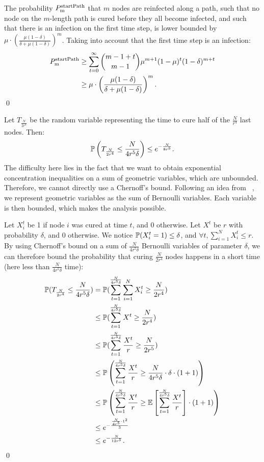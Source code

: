 \begin{corollary} \label{cor:Ppath} 
	The probability $P^{\rm startPath}_{\rm m}$ that $m$ nodes are reinfected along a path, such that no node on the $m$-length path is cured before they all become infected, and such that there is an infection on the first time step, is lower bounded by $\mu\cdot \left(\frac{\mu (1-\delta)}{\delta + \mu (1-\delta)} \right)^{m}$.
	\proof Taking into account that the first time step is an infection:
	\begin{align*}
	P^{\rm startPath}_{\rm m} &\geq \sum_{t=0}^{\infty}  {m - 1 + t \choose m - 1}  \mu^{m+1} (1-\mu)^t (1-\delta)^{m + t} \\
	&\geq \mu \cdot\left(\frac{\mu (1-\delta)}{\delta + \mu (1-\delta)} \right)^{m}.
	\end{align*}
	\qed 
\end{corollary}

\begin{proposition}\label{cl:chernoffEndgame} 
	Let $T_{\frac{N}{2r^4}}$ be the random variable representing the time to cure half of the $\frac{N}{r^4}$ last nodes. Then: 
	$$\mathbb{P}\left(T_{\frac{N}{2r^4}} \leq \frac{N}{4r^5\delta}\right) \leq e^{-\frac{N}{8r^5}}.$$
	\proof The difficulty here lies in the fact that we want to obtain exponential concentration inequalities on a sum of geometric variables, which are unbounded. Therefore, we cannot directly use a Chernoff's bound. Following an idea from ~\cite{Brown}, we represent geometric variables as the sum of Bernoulli variables. Each variable is then bounded, which makes the analysis possible.
	
	Let $X_i^t$ be 1 if node $i$ was cured at time $t$, and 0 otherwise. Let $X^t$ be $r$ with probability $\delta$, and 0 otherwise. We notice $\mathbb{P}(X_i^t = 1) \leq \delta$, and $\forall t, \sum_{i=1}^{N} X_i^t \leq r$. By using Chernoff's bound on a sum of $\frac{N}{4r^5\delta}$ Bernoulli variables of parameter $\delta$, we can therefore bound the probability that curing $\frac{N}{2r^4}$ nodes happens in a short time (here less than $\frac{N}{4r^5\delta}$ time):
	\begin{align*}
	\mathbb{P}(T_{\frac{N}{2r^4}} \leq \frac{N}{4r^5\delta}) &= \mathbb{P}(\sum_{t=1}^{\frac{N}{4r^5\delta}} \sum_{i=1}^{N} X_i^t \geq \frac{N}{2r^4}) \\
	&\leq \mathbb{P}(\sum_{t=1}^{ \frac{N}{4r^5\delta}} X^t \geq \frac{N}{2r^4}) \\
	&\leq \mathbb{P}(\sum_{t=1}^{ \frac{N}{4r^5\delta}} \frac{X^t}{r} \geq \frac{N}{2r^5}) \\
	&\leq \mathbb{P}\left(\sum_{t=1}^{ \frac{N}{4r^5\delta}} \frac{X^t}{r} \geq \frac{N}{4r^5\delta}\cdot \delta \cdot (1+1)\right) \\
	&\leq \mathbb{P}\left(\sum_{t=1}^{ \frac{N}{4r^5\delta}} \frac{X^t}{r} \geq \mathbb{E}\left[\sum_{t=1}^{ \frac{N}{4r^5\delta}} \frac{X^t}{r} \right]\cdot (1+1)\right) \\
	&\leq e^{-\frac{ \frac{N}{4r^5}\cdot 1^2}{3}} \\
	&\leq e^{-\frac{N}{12r^5}}.
	\end{align*}
	\qed
\end{proposition}

